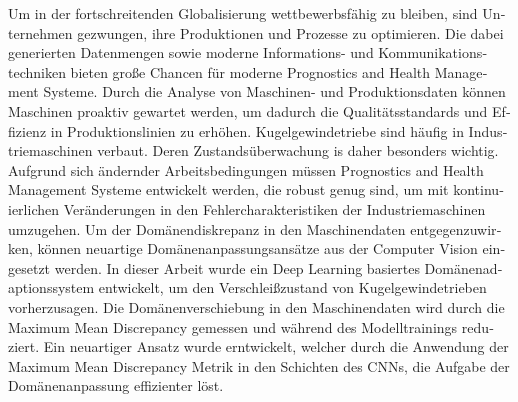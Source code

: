 \begin{otherlanguage}{ngerman} %
Um in der fortschreitenden Globalisierung wettbewerbsfähig zu bleiben, sind Unternehmen gezwungen, ihre Produktionen und Prozesse zu optimieren. Die dabei generierten Datenmengen sowie moderne Informations- und Kommunikationstechniken bieten große Chancen für moderne Prognostics and Health Management Systeme. Durch die Analyse von Maschinen- und Produktionsdaten können Maschinen proaktiv gewartet werden, um dadurch die Qualitätsstandards und Effizienz in Produktionslinien zu erhöhen. Kugelgewindetriebe sind häufig in Industriemaschinen verbaut. Deren Zustandsüberwachung is daher besonders wichtig. Aufgrund sich ändernder Arbeitsbedingungen müssen Prognostics and Health Management Systeme entwickelt werden, die robust genug sind, um mit kontinuierlichen Veränderungen in den Fehlercharakteristiken der Industriemaschinen umzugehen. Um der Domänendiskrepanz in den Maschinendaten entgegenzuwirken, können neuartige Domänenanpassungsansätze aus der Computer Vision eingesetzt werden. In dieser Arbeit wurde ein Deep Learning basiertes Domänenadaptionssystem entwickelt, um den Verschleißzustand von Kugelgewindetrieben vorherzusagen. Die Domänenverschiebung in den Maschinendaten wird durch die Maximum Mean Discrepancy gemessen und während des Modelltrainings reduziert. Ein neuartiger Ansatz wurde erntwickelt, welcher durch die Anwendung der Maximum Mean Discrepancy Metrik in den Schichten des CNNs, die Aufgabe der Domänenanpassung effizienter löst.



\end{otherlanguage}


\makeatletter
{}
{\renewcommand{\abstractname}{Abstract}}
{\renewcommand{\abstractname}{Kurzfassung}}
\makeatother